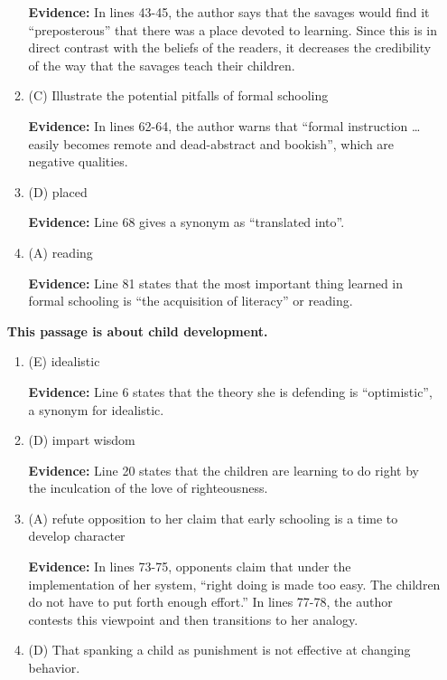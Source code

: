 \begin{enumerate}
\begin{enumerate}
\textbf{Evidence:} In lines 43-45, the author says that the savages would find it ``preposterous'' that there was a place devoted to learning. Since this is in direct contrast with the beliefs of the readers, it decreases the credibility of the way that the savages teach their children. 

\bigskip
\item (C) Illustrate the potential pitfalls of formal schooling

\textbf{Evidence:} In lines 62-64, the author warns that ``formal instruction \ldots easily becomes remote and dead-abstract and bookish'', which are negative qualities. 

\bigskip
\item (D) placed

\textbf{Evidence:} Line 68 gives a synonym as ``translated into''. 

\bigskip
\item (A) reading

\textbf{Evidence:} Line 81 states that the most important thing learned in formal schooling is ``the acquisition of literacy'' or reading. 

\end{enumerate}

\textbf{This passage is about child development.}

\begin{enumerate}
\item (E) idealistic

\textbf{Evidence:} Line 6 states that the theory she is defending is ``optimistic'', a synonym for idealistic. 

\bigskip
\item (D) impart wisdom

\textbf{Evidence:} Line 20 states that the children are learning to do right by the inculcation of the love of righteousness.

\bigskip
\item (A) refute opposition to her claim that early schooling is a time to develop character

\textbf{Evidence:} In lines 73-75, opponents claim that under the implementation of her system, ``right doing is made too easy. The children do not have to put forth enough effort.'' In lines 77-78, the author contests this viewpoint and then transitions to her analogy.

\bigskip
\item (D) That spanking a child as punishment is not effective at changing behavior.


\end{enumerate}
\end{enumerate}
